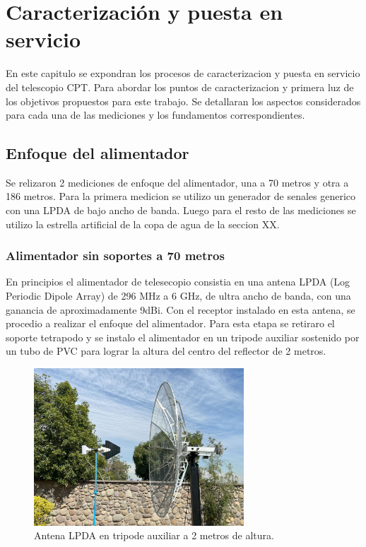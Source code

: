 \chapter{Caracterización y puesta en servicio}

En este capitulo se expondran los procesos de caracterizacion y puesta en servicio del telescopio CPT. Para abordar los puntos de caracterizacion y primera luz de los objetivos propuestos para este trabajo. Se detallaran los aspectos considerados para cada una de las mediciones y los fundamentos correspondientes.

\section{Enfoque del alimentador}

Se relizaron 2 mediciones de enfoque del alimentador, una a 70 metros y otra a 186 metros. Para la primera medicion se utilizo un generador de senales generico con una LPDA de bajo ancho de banda. Luego para el resto de las mediciones se utilizo la estrella artificial de la copa de agua de la seccion XX.\\

\subsection{Alimentador sin soportes a 70 metros}

En principios el alimentador de telesecopio consistia en una antena LPDA (Log Periodic Dipole Array) de 296 MHz a 6 GHz, de ultra ancho de banda, con una ganancia de aproximadamente 9dBi. Con el receptor instalado en esta antena, se procedio a realizar el enfoque del alimentador. Para esta etapa se retiraro el soporte tetrapodo y se instalo el alimentador en un tripode auxiliar sostenido por un tubo de PVC para lograr la altura del centro del reflector de 2 metros.\\

\begin{figure}
    \centering
    \includegraphics[width=0.7\textwidth]{img/enfoque1}
    \caption{Antena LPDA en tripode auxiliar a 2 metros de altura.}
    \label{fig:antena_lpda}
\end{figure}

